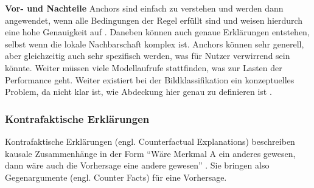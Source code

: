 
\textbf{Vor- und Nachteile}
Anchors sind einfach zu verstehen und werden dann angewendet, wenn alle Bedingungen der Regel erfüllt sind und weisen hierdurch eine hohe Genauigkeit auf \cite{ribeiro2018anchors}. Daneben können auch genaue Erklärungen entstehen, selbst wenn die lokale Nachbarschaft komplex ist. 
Anchors können sehr generell, aber gleichzeitig auch sehr spezifisch werden, was für Nutzer verwirrend sein könnte. Weiter müssen viele Modellaufrufe stattfinden, was zur Lasten der Performance geht. Weiter existiert bei der Bildklassifikation ein konzeptuelles Problem, da nicht klar ist, wie Abdeckung hier genau zu definieren ist \cite{molnar2022}.

\subsubsection{Kontrafaktische Erklärungen}
Kontrafaktische Erklärungen (engl. Counterfactual Explanations) beschreiben kausale Zusammenhänge in der Form \enquote{Wäre Merkmal A ein anderes gewesen, dann wäre auch die Vorhersage eine andere gewesen} \cite{molnar2022}. Sie bringen also Gegenargumente (engl. Counter Facts) für eine Vorhersage.

